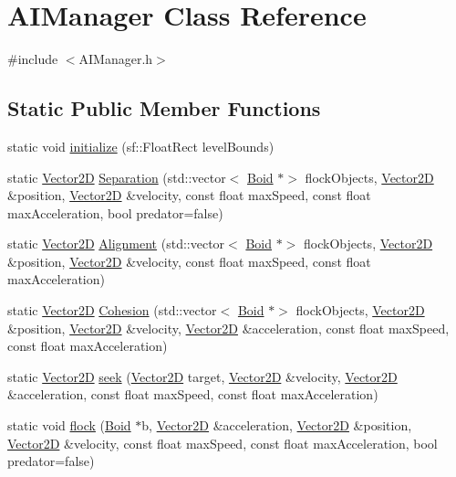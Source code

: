 \hypertarget{class_a_i_manager}{}\section{A\+I\+Manager Class Reference}
\label{class_a_i_manager}


{\ttfamily \#include $<$A\+I\+Manager.\+h$>$}

\subsection*{Static Public Member Functions}
\begin{DoxyCompactItemize}
\item 
static void \hyperlink{class_a_i_manager_a9ac554c9d74432fe3ef74fedab936847}{initialize} (sf\+::\+Float\+Rect level\+Bounds)
\item 
static \hyperlink{class_vector2_d}{Vector2D} \hyperlink{class_a_i_manager_a5d0b2b08188e1e3ccf816480e70cd123}{Separation} (std\+::vector$<$ \hyperlink{class_boid}{Boid} $\ast$$>$ flock\+Objects, \hyperlink{class_vector2_d}{Vector2D} \&position, \hyperlink{class_vector2_d}{Vector2D} \&velocity, const float max\+Speed, const float max\+Acceleration, bool predator=false)
\item 
static \hyperlink{class_vector2_d}{Vector2D} \hyperlink{class_a_i_manager_afe3cf14648ae243d21f4cabaa8cc2ec1}{Alignment} (std\+::vector$<$ \hyperlink{class_boid}{Boid} $\ast$$>$ flock\+Objects, \hyperlink{class_vector2_d}{Vector2D} \&position, \hyperlink{class_vector2_d}{Vector2D} \&velocity, const float max\+Speed, const float max\+Acceleration)
\item 
static \hyperlink{class_vector2_d}{Vector2D} \hyperlink{class_a_i_manager_ae70e083ab30b71c15384f5bdb345b462}{Cohesion} (std\+::vector$<$ \hyperlink{class_boid}{Boid} $\ast$$>$ flock\+Objects, \hyperlink{class_vector2_d}{Vector2D} \&position, \hyperlink{class_vector2_d}{Vector2D} \&velocity, \hyperlink{class_vector2_d}{Vector2D} \&acceleration, const float max\+Speed, const float max\+Acceleration)
\item 
static \hyperlink{class_vector2_d}{Vector2D} \hyperlink{class_a_i_manager_a6fb60f6d1707822f1d692272467cc06e}{seek} (\hyperlink{class_vector2_d}{Vector2D} target, \hyperlink{class_vector2_d}{Vector2D} \&velocity, \hyperlink{class_vector2_d}{Vector2D} \&acceleration, const float max\+Speed, const float max\+Acceleration)
\item 
static void \hyperlink{class_a_i_manager_ac57a276bbab23a0db4aafe9392dea156}{flock} (\hyperlink{class_boid}{Boid} $\ast$b, \hyperlink{class_vector2_d}{Vector2D} \&acceleration, \hyperlink{class_vector2_d}{Vector2D} \&position, \hyperlink{class_vector2_d}{Vector2D} \&velocity, const float max\+Speed, const float max\+Acceleration, bool predator=false)
$$
\end{DoxyCompactItemize}
